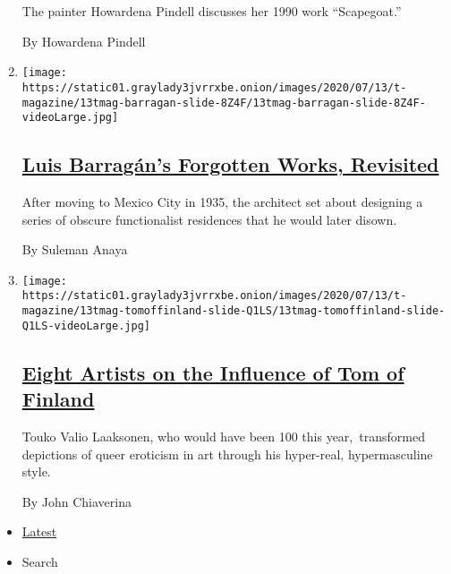 \begin{enumerate}
  The painter Howardena Pindell discusses her 1990 work ``Scapegoat.''

  By Howardena Pindell
\item
  \texttt{[image: https://static01.graylady3jvrrxbe.onion/images/2020/07/13/t-magazine/13tmag-barragan-slide-8Z4F/13tmag-barragan-slide-8Z4F-videoLarge.jpg]}

  \hypertarget{luis-barraguxe1ns-forgotten-works-revisited-1}{%
  \subsection{\texorpdfstring{\href{/2020/07/24/t-magazine/luis-barragan.html}{Luis
  Barragán's Forgotten Works,
  Revisited}}{Luis Barragán's Forgotten Works, Revisited}}\label{luis-barraguxe1ns-forgotten-works-revisited-1}}

  After moving to Mexico City in 1935, the architect set about designing
  a series of obscure functionalist residences that he would later
  disown.

  By Suleman Anaya
\item
  \texttt{[image: https://static01.graylady3jvrrxbe.onion/images/2020/07/13/t-magazine/13tmag-tomoffinland-slide-Q1LS/13tmag-tomoffinland-slide-Q1LS-videoLarge.jpg]}

  \hypertarget{eight-artists-on-the-influence-of-tom-of-finland}{%
  \subsection{\texorpdfstring{\href{/2020/07/23/t-magazine/tom-of-finland.html}{Eight
  Artists on the Influence of Tom of
  Finland}}{Eight Artists on the Influence of Tom of Finland}}\label{eight-artists-on-the-influence-of-tom-of-finland}}

  Touko Valio Laaksonen, who would have been 100 this year,~transformed
  depictions of queer eroticism in art through his hyper-real,
  hypermasculine style.

  By John Chiaverina
\end{enumerate}

\begin{itemize}
\tightlist
\item
  \protect\hyperlink{stream-panel}{Latest}
\item
  Search
\end{itemize}


